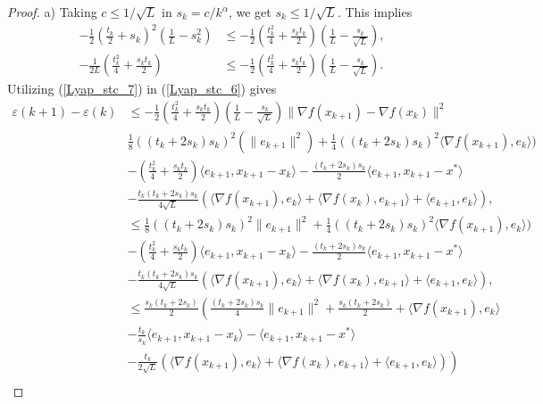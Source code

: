 \documentclass{article}
\theoremstyle{plain}
\theoremstyle{definition}
\theoremstyle{remark}
\begin{document}
\begin{proof}
        a) Taking $c\leq 1/\sqrt{L}$ in $s_k=c/k^{\alpha}$, we get $s_k\leq 1/\sqrt{L}$. This implies 
        \begin{align}\label{Lyap_stc_7}
            -\frac{1}{2}\left(\frac{t_k}{2}+s_k\right)^2(\frac{1}{L}-s_k^2)&\leq -\frac{1}{2}\left(\frac{t_k^2}{4}+\frac{s_kt_k}{2} \right)(\frac{1}{L}-\frac{s_k}{\sqrt{L}}),\nonumber\\
            -\frac{1}{2L}\left(\frac{t_{k}^2}{4}+\frac{s_{k}t_{k}}{2}\right)&\leq -\frac{1}{2}\left(\frac{t_k^2}{4}+\frac{s_kt_k}{2} \right)(\frac{1}{L}-\frac{s_k}{\sqrt{L}}).
        \end{align}
        Utilizing (\ref{Lyap_stc_7}) in (\ref{Lyap_stc_6}) gives
        \begin{align}\label{Lyap_stc_8}
            \varepsilon(k+1)-\varepsilon(k)&\leq -\frac{1}{2}\left(\frac{t_k^2}{4}+\frac{s_kt_k}{2} \right)(\frac{1}{L}-\frac{s_k}{\sqrt{L}})\|\nabla f(x_{k+1})-\nabla f(x_k)\|^2\nonumber\\
            &\frac{1}{8}((t_k+2s_k)s_k)^2(\|e_{k+1}\|^2)+\frac{1}{4}((t_k+2s_k)s_k)^2\langle \nabla f(x_{k+1}) ,e_k \rangle)\nonumber\\
         & -(\frac{t_k^2}{4}+\frac{s_kt_k}{2})\langle e_{k+1},x_{k+1}-x_k\rangle-\frac{(t_k+2s_k)s_k}{2}\langle e_{k+1},x_{k+1}-x^*\rangle\nonumber\\
         &-\frac{t_k(t_k+2s_k)s_k}{4\sqrt{L}}\left(\langle \nabla f(x_{k+1}),e_k \rangle+\langle \nabla f(x_{k}) , e_{k+1}\rangle+\langle e_{k+1},e_k\rangle\right),\nonumber\\
         &\leq \frac{1}{8}((t_k+2s_k)s_k)^2\|e_{k+1}\|^2+\frac{1}{4}((t_k+2s_k)s_k)^2\langle \nabla f(x_{k+1}) ,e_k \rangle)\nonumber\\
         & -(\frac{t_k^2}{4}+\frac{s_kt_k}{2})\langle e_{k+1},x_{k+1}-x_k\rangle-\frac{(t_k+2s_k)s_k}{2}\langle e_{k+1},x_{k+1}-x^*\rangle\nonumber\\
         &-\frac{t_k(t_k+2s_k)s_k}{4\sqrt{L}}\left(\langle \nabla f(x_{k+1}),e_k \rangle+\langle \nabla f(x_{k}) , e_{k+1}\rangle+\langle e_{k+1},e_k\rangle\right),\nonumber\\
         &\leq \frac{s_k(t_k+2s_k)}{2}\left(\frac{(t_k+2s_k)s_k}{4}\|e_{k+1}\|^2+\frac{s_k(t_k+2s_k)}{2}+\langle \nabla f(x_{k+1}) ,e_k \rangle\right.\nonumber\\
         &-\frac{t_k}{s_k}\langle e_{k+1},x_{k+1}-x_k\rangle-\langle e_{k+1},x_{k+1}-x^*\rangle\nonumber\\
         &\left.-\frac{t_k}{2\sqrt{L}}\left(\langle \nabla f(x_{k+1}),e_k \rangle+\langle \nabla f(x_{k}) , e_{k+1}\rangle+\langle e_{k+1},e_k\rangle\right)\right)\nonumber\\

\end{align}
\end{proof}
\end{document}
